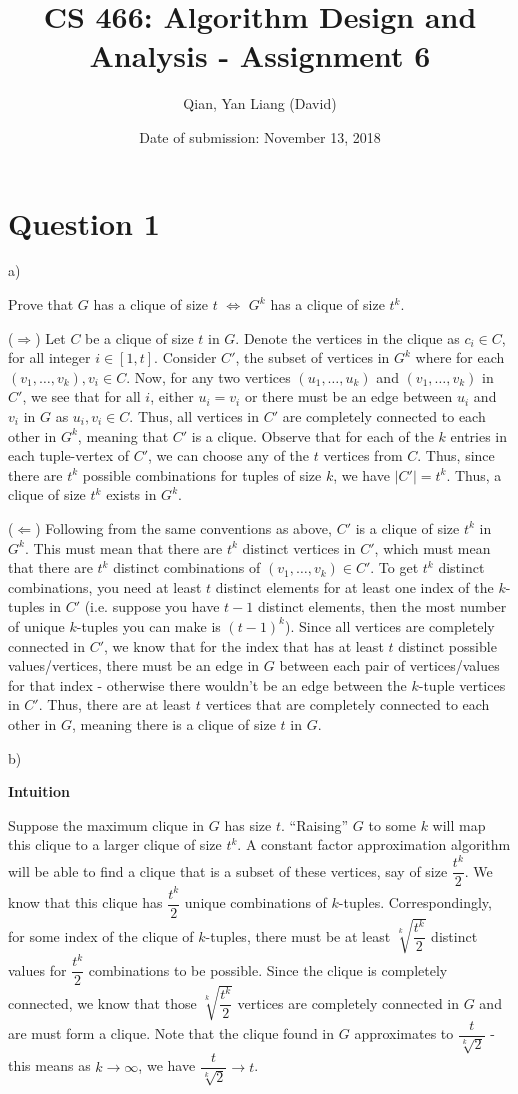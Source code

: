 \documentclass{article}
\title{CS 466: Algorithm Design and Analysis - Assignment 6}
\author{Qian, Yan Liang (David)}
\date{Date of submission: November 13, 2018}
\begin{document}
\newpage

\section{Question 1}

a)

Prove that $G$ has a clique of size $t$ $\iff$ $G^k$ has a clique of size $t^k$.

($\Rightarrow$) Let $C$ be a clique of size $t$ in $G$. Denote the vertices in the clique as $c_i \in C$, for all
integer $i \in [1, t]$. Consider $C'$, the subset of vertices in $G^k$ where for each $(v_1, \ldots, v_k), v_i \in C$.
Now, for any two vertices $(u_1, \ldots, u_k)$ and $(v_1, \ldots, v_k)$ in $C'$, we see that for all $i$, either $u_i =
v_i$ or there must be an edge between $u_i$ and $v_i$ in $G$ as $u_i, v_i \in C$. Thus, all vertices in $C'$ are
completely connected to each other in $G^k$, meaning that $C'$ is a clique. Observe that for each of the $k$ entries in
each tuple-vertex of $C'$, we can choose any of the $t$ vertices from $C$. Thus, since there are $t^k$ possible
combinations for tuples of size $k$, we have $|C'| = t^k$. Thus, a clique of size $t^k$ exists in $G^k$.

($\Leftarrow$) Following from the same conventions as above, $C'$ is a clique of size $t^k$ in $G^k$. This must mean
that there are $t^k$ distinct vertices in $C'$, which must mean that there are $t^k$ distinct combinations of $(v_1,
\ldots, v_k) \in C'$. To get $t^k$ distinct combinations, you need at least $t$ distinct elements for at least one index
of the $k$-tuples in $C'$ (i.e. suppose you have $t-1$ distinct elements, then the most number of unique $k$-tuples you can
make is $(t-1)^k$).  Since all vertices are completely connected in $C'$, we know that for the index that has at least
$t$ distinct possible values/vertices, there must be an edge in $G$ between each pair of vertices/values for that index
- otherwise there wouldn't be an edge between the $k$-tuple vertices in $C'$. Thus, there are at least $t$ vertices that
are completely connected to each other in $G$, meaning there is a clique of size $t$ in $G$.


b)

\textbf{Intuition}

Suppose the maximum clique in $G$ has size $t$. ``Raising'' $G$ to some $k$ will map this clique to a larger clique of
size $t^k$. A constant factor approximation algorithm will be able to find a clique that is a subset of these vertices,
say of size $\dfrac{t^k}{2}$. We know that this clique has $\dfrac{t^k}{2}$ unique combinations of $k$-tuples.
Correspondingly, for some index of the clique of $k$-tuples, there must be at least $\sqrt[k]{\dfrac{t^k}{2}}$ distinct
values for $\dfrac{t^k}{2}$ combinations to be possible.  Since the clique is completely connected, we know that those
$\sqrt[k]{\dfrac{t^k}{2}}$ vertices are completely connected in $G$ and are must form a clique. Note that the clique
found in $G$ approximates to $\dfrac{t}{\sqrt[k]{2}}$ - this means as $k \rightarrow \infty$, we have
$\dfrac{t}{\sqrt[k]{2}} \rightarrow t$.
\end{document}
